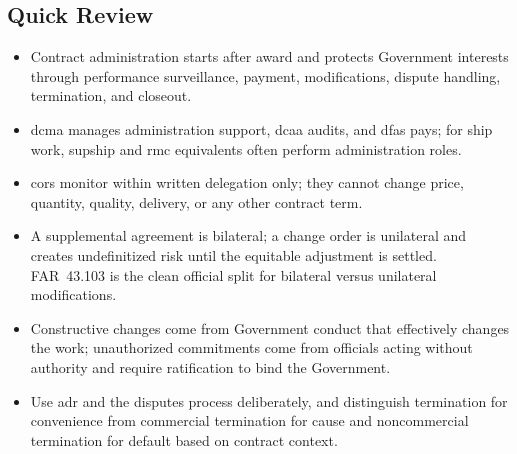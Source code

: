 \documentclass[../main.tex]{subfiles}
\begin{document}
\subsection{Quick Review}
\begin{itemize}
  \item Contract administration starts after award and protects Government interests through performance surveillance, payment, modifications, dispute handling, termination, and closeout.
  \item \ac{dcma} manages administration support, \ac{dcaa} audits, and \ac{dfas} pays; for ship work, \ac{supship} and \ac{rmc} equivalents often perform administration roles.
  \item \acp{cor} monitor within written delegation only; they cannot change price, quantity, quality, delivery, or any other contract term.
  \item A supplemental agreement is bilateral; a change order is unilateral and creates undefinitized risk until the equitable adjustment is settled. FAR~43.103 is the clean official split for bilateral versus unilateral modifications.
  \item Constructive changes come from Government conduct that effectively changes the work; unauthorized commitments come from officials acting without authority and require ratification to bind the Government.
  \item Use \ac{adr} and the disputes process deliberately, and distinguish termination for convenience from commercial termination for cause and noncommercial termination for default based on contract context.
\end{itemize}

\end{document}
